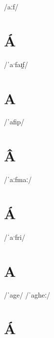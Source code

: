 \documentclass[10pt,a4paper,twoside]{book}
\begin{document}
\begin{multicols}{3}
 {/aːf/} {}
\end{multicols}

\section*{Á}

\begin{multicols}{3}
 {/ˈaˑfaɪ̯f/} {}
\end{multicols}

\section*{A}

\begin{multicols}{3}
 {/ˈafip/} {}
\end{multicols}

\section*{Â}

\begin{multicols}{3}
 {/ˈaːfmaː/} {}
\end{multicols}

\section*{Á}

\begin{multicols}{3}
 {/ˈaˑfri/} {}
\end{multicols}

\section*{A}

\begin{multicols}{3}
 {/ˈage/} {}
 {/ˈagheː/} {}
\end{multicols}

\section*{Á}
\end{document}
